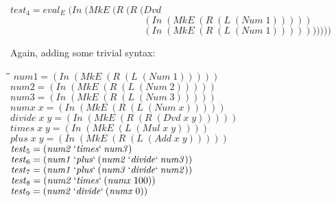 \documentclass[10pt]{article}
\newlength{\lwidth}\setlength{\lwidth}{4.5cm}
\newlength{\cwidth}\setlength{\cwidth}{8mm} %
\newcommand{\Conid}[1]{\mathit{#1}}
\newcommand{\Varid}[1]{\mathit{#1}}
\begin{document}
\begin{tabbing}
${}$\\
${\Varid{test}_4\mathrel{=}\Varid{eval}_E\;(\Conid{In}\;(\Conid{MkE}\;(\Conid{R}\;(\Conid{R}\;(\Conid{Dvd}}$\\
${\phantom{\Varid{test}_4\mathrel{=}\Varid{eval}_E\;(\Conid{In}\;(\Conid{MkE}\;(\Conid{R}\;(\Conid{R}\;(\mbox{}}(\Conid{In}\;(\Conid{MkE}\;(\Conid{R}\;(\Conid{L}\;(\Conid{Num}\;\mathrm{1})))))}$\\
${\phantom{\Varid{test}_4\mathrel{=}\Varid{eval}_E\;(\Conid{In}\;(\Conid{MkE}\;(\Conid{R}\;(\Conid{R}\;(\mbox{}}(\Conid{In}\;(\Conid{MkE}\;(\Conid{R}\;(\Conid{L}\;(\Conid{Num}\;\mathrm{1}))))))))))}$
\end{tabbing}
Again, adding some trivial syntax:

\begin{tabbing}
\qquad\=\hspace{\lwidth}\=\hspace{\cwidth}\=\+\kill
${\Varid{num1}\mathrel{=}(\Conid{In}\;(\Conid{MkE}\;(\Conid{R}\;(\Conid{L}\;(\Conid{Num}\;\mathrm{1})))))}$\\
${\Varid{num2}\mathrel{=}(\Conid{In}\;(\Conid{MkE}\;(\Conid{R}\;(\Conid{L}\;(\Conid{Num}\;\mathrm{2})))))}$\\
${\Varid{num3}\mathrel{=}(\Conid{In}\;(\Conid{MkE}\;(\Conid{R}\;(\Conid{L}\;(\Conid{Num}\;\mathrm{3})))))}$\\
${\Varid{numx}\;\Varid{x}\mathrel{=}(\Conid{In}\;(\Conid{MkE}\;(\Conid{R}\;(\Conid{L}\;(\Conid{Num}\;\Varid{x})))))}$\\
${\Varid{divide}\;\Varid{x}\;\Varid{y}\mathrel{=}(\Conid{In}\;(\Conid{MkE}\;(\Conid{R}\;(\Conid{R}\;(\Conid{Dvd}\;\Varid{x}\;\Varid{y})))))}$\\
${\Varid{times}\;\Varid{x}\;\Varid{y}\mathrel{=}(\Conid{In}\;(\Conid{MkE}\;(\Conid{L}\;(\Conid{Mul}\;\Varid{x}\;\Varid{y}))))}$\\
${\Varid{plus}\;\Varid{x}\;\Varid{y}\mathrel{=}(\Conid{In}\;(\Conid{MkE}\;(\Conid{R}\;(\Conid{L}\;(\Conid{Add}\;\Varid{x}\;\Varid{y})))))}$\\
${}$\\
${\Varid{test}_5\mathrel{=}(\Varid{num2}\mathbin{`\Varid{times}`}\Varid{num3})}$\\
${}$\\
${\Varid{test}_6\mathrel{=}(\Varid{num1}\mathbin{`\Varid{plus}`}(\Varid{num2}\mathbin{`\Varid{divide}`}\Varid{num3}))}$\\
${}$\\
${\Varid{test}_7\mathrel{=}(\Varid{num1}\mathbin{`\Varid{plus}`}(\Varid{num3}\mathbin{`\Varid{divide}`}\Varid{num2}))}$\\
${}$\\
${\Varid{test}_8\mathrel{=}(\Varid{num2}\mathbin{`\Varid{times}`}(\Varid{numx}\;\mathrm{100}))}$\\
${}$\\
${\Varid{test}_9\mathrel{=}(\Varid{num2}\mathbin{`\Varid{divide}`}(\Varid{numx}\;\mathrm{0}))}$
\end{tabbing}
\end{document}
